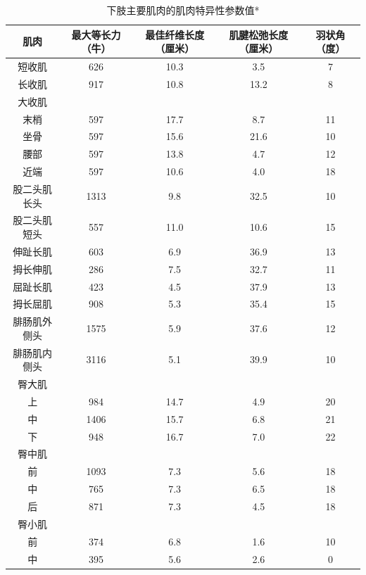\begin{table}[htbp]
	\caption{下肢主要肌肉的肌肉特异性参数值*} \label{tab:5_2} \centering
	\begin{tabular}{ccccc} %
		\toprule
		肌肉 & 最大等长力（牛） & 最佳纤维长度（厘米）& 肌腱松弛长度（厘米） &  羽状角（度） \\
		\midrule
		短收肌 & 626 &  10.3 & 3.5 & 7 \\
		\midrule
		长收肌 & 917 &  10.8 & 13.2 & 8 \\
		\midrule
		大收肌 &  &   &  &  \\
		\midrule
		末梢 & 597 &  17.7 & 8.7 & 11 \\
		\midrule
		坐骨 & 597 &  15.6 & 21.6 & 10 \\
		\midrule
		腰部 & 597 &  13.8 & 4.7 & 12 \\
		\midrule
		近端 & 597 &  10.6 & 4.0 & 18 \\
		\midrule
		股二头肌长头 & 1313 &  9.8 & 32.5 & 10 \\
		\midrule
		股二头肌短头 & 557 &  11.0 & 10.6 & 15 \\
		\midrule
		伸趾长肌 & 603 &  6.9 & 36.9 & 13 \\
		\midrule
		拇长伸肌 & 286 &  7.5 & 32.7 & 11 \\
		\midrule
		屈趾长肌 & 423 &  4.5 & 37.9 & 13 \\
		\midrule
		拇长屈肌 & 908 &  5.3 & 35.4 & 15 \\
		\midrule
		腓肠肌外侧头 & 1575 &  5.9 & 37.6 & 12 \\
		\midrule
		腓肠肌内侧头 & 3116 &  5.1 & 39.9 & 10 \\
		\midrule
		臀大肌 &  &   &  &  \\
		\midrule
		上 & 984 &  14.7 & 4.9 & 20 \\
		\midrule
		中 & 1406 &  15.7 & 6.8 & 21 \\
		\midrule
		下 & 948 &  16.7 & 7.0 & 22 \\
		\midrule
		臀中肌 &  &   &  &  \\
		\midrule
		前 & 1093 &  7.3 & 5.6 & 18 \\
		\midrule
		中 & 765 &  7.3 & 6.5 & 18 \\
		\midrule
		后 & 871 &  7.3 & 4.5 & 18 \\
		\midrule
		臀小肌 &  &   &  &  \\
		\midrule
		前 & 374 &  6.8 & 1.6 & 10 \\
		\midrule
		中 & 395 &  5.6 & 2.6 & 0 \\
		\midrule

\end{tabular}
\end{table}
